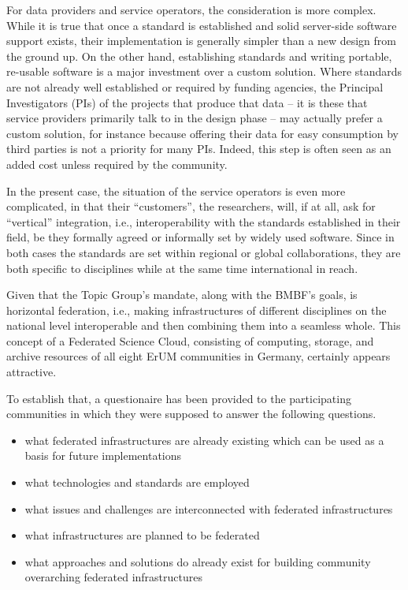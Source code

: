 \documentclass{article}
\begin{document}
For data providers and service operators, the consideration is more
complex.  While it is true that once a standard is established and solid
server-side software support exists, their implementation is generally
simpler than a new design from the ground up.  On the other hand,
establishing standards and writing portable, re-usable software is a
major investment over a custom solution.  Where standards are not
already well established or required by funding agencies, the Principal
Investigators (PIs) of the projects that produce that data --
it is these that service providers primarily talk to in the design phase
-- may actually prefer a custom
solution, for instance because offering their data for easy consumption by
third parties is not a priority for many PIs.  Indeed, this step is
often seen as an added cost unless required by the community.

In the present case, the situation of the service operators is even more
complicated, in that their ``customers'', the researchers, will, if at
all, ask for ``vertical'' integration, i.e., interoperability with
the standards established in their field, be they formally agreed or
informally set by widely used software.  Since in both cases the
standards are set within regional or global collaborations, they are
both specific to disciplines while at the same time international in
reach.

Given that the Topic Group's mandate, along with the BMBF's 
goals, is horizontal federation, i.e., making 
infrastructures of different disciplines on the national level
interoperable and then combining them into a seamless whole.  This
concept of a Federated Science Cloud, consisting of computing,
storage, and archive resources of all eight ErUM communities in Germany,
certainly appears attractive.

To establish that, a questionaire has been provided to the participating communities
in which they were supposed to answer the following questions.


\begin{itemize}
\item what federated infrastructures are already existing which can be used as a basis for future implementations
\item what technologies and standards are employed
\item what issues and challenges are interconnected with federated infrastructures
\item what infrastructures are planned to be federated
\item what approaches and solutions do already exist for building community overarching federated infrastructures
\end{itemize}
\end{document}
